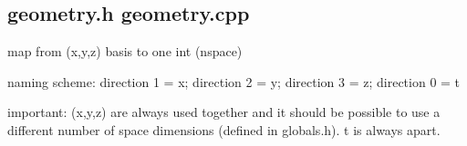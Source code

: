 \subsection{geometry.h geometry.cpp}
map from (x,y,z) basis to one int (nspace)

naming scheme: direction 1 = x; direction 2 = y; direction 3 = z; direction 0 = t

important: (x,y,z) are always used together and it should be possible to use a different number of space dimensions (defined in globals.h). t is always apart.
